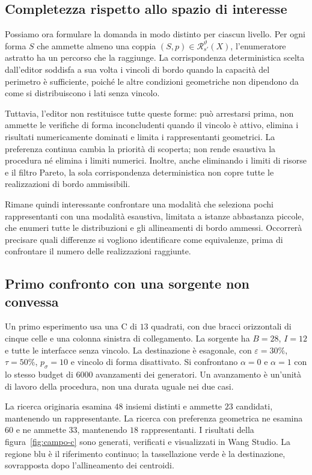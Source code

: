 \documentclass[11pt,a4paper]{article}
\begin{document}
\subsection{Completezza rispetto allo spazio di interesse}

Possiamo ora formulare la domanda in modo distinto per ciascun livello. Per ogni forma $S$ che ammette almeno una coppia $(S,p)\in\mathcal R_{s'}^{\vartheta}(X)$, l'enumeratore astratto ha un percorso che la raggiunge. La corrispondenza deterministica scelta dall'editor soddisfa a sua volta i vincoli di bordo quando la capacità del perimetro è sufficiente, poiché le altre condizioni geometriche non dipendono da come si distribuiscono i lati senza vincolo.

Tuttavia, l'editor non restituisce tutte queste forme: può arrestarsi prima, non ammette le verifiche di forma inconcludenti quando il vincolo è attivo, elimina i risultati numericamente dominati e limita i rappresentanti geometrici. La preferenza continua cambia la priorità di scoperta; non rende esaustiva la procedura né elimina i limiti numerici. Inoltre, anche eliminando i limiti di risorse e il filtro Pareto, la sola corrispondenza deterministica non copre tutte le realizzazioni di bordo ammissibili.

Rimane quindi interessante confrontare una modalità che seleziona pochi rappresentanti con una modalità esaustiva, limitata a istanze abbastanza piccole, che enumeri tutte le distribuzioni e gli allineamenti di bordo ammessi. Occorrerà precisare quali differenze si vogliono identificare come equivalenze, prima di confrontare il numero delle realizzazioni raggiunte.

\subsection{Primo confronto con una sorgente non convessa}
\label{sec:esperimento-c}

Un primo esperimento usa una C di $13$ quadrati, con due bracci orizzontali di cinque celle e una colonna sinistra di collegamento. La sorgente ha $B=28$, $I=12$ e tutte le interfacce senza vincolo. La destinazione è esagonale, con $\varepsilon=30\%$, $\tau=50\%$, $p_\sigma=10$ e vincolo di forma disattivato. Si confrontano $\alpha=0$ e $\alpha=1$ con lo stesso budget di $6000$ avanzamenti dei generatori. Un avanzamento è un'unità di lavoro della procedura, non una durata uguale nei due casi.

La ricerca originaria esamina $48$ insiemi distinti e ammette $23$ candidati, mantenendo un rappresentante. La ricerca con preferenza geometrica ne esamina $60$ e ne ammette $33$, mantenendo $18$ rappresentanti. I risultati della figura~\ref{fig:campo-c} sono generati, verificati e visualizzati in Wang Studio. La regione blu è il riferimento continuo; la tassellazione verde è la destinazione, sovrapposta dopo l'allineamento dei centroidi.
\end{document}
